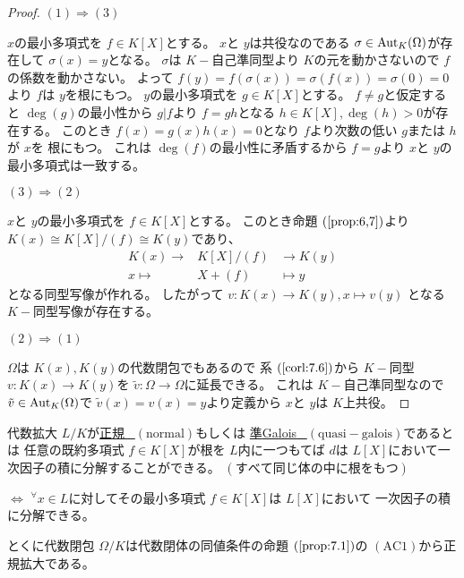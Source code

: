 \documentclass[../master_galois_theory]{subfiles}
\begin{document}
\begin{proof}
  $(1) \Rightarrow (3)$

  $x$の最小多項式を $f \in K[X]$とする。
  $x$と $y$は共役なのである $\sigma \in \mathrm{Aut}_K(\Omega)$が存在して
  $\sigma(x) = y$となる。
  $\sigma$は $K-$自己準同型より $K$の元を動かさないので $f$の係数を動かさない。
  よって $f(y) = f(\sigma(x)) = \sigma(f(x)) = \sigma(0) = 0$より
  $f$は $y$を根にもつ。
  $y$の最小多項式を $g \in K[X]$とする。
  $f \neq g$と仮定すると $\deg(g)$の最小性から $g|f$より
  $f = gh$となる $h \in K[X] , \deg(h) > 0$が存在する。
  このとき $f(x) = g(x)h(x) = 0$となり $f$より次数の低い $g$または $h$が $x$を
  根にもつ。
  これは $\deg(f)$の最小性に矛盾するから $f = g$より $x$と $y$の最小多項式は一致する。

  $(3) \Rightarrow (2)$

  $x$と $y$の最小多項式を $f \in K[X]$とする。
  このとき命題 $(\mathrm{\ref{prop:6,7}})$より
  $K(x) \cong K[X]/(f) \cong K(y)$であり、
  \begin{eqnarray*}
    K(x) \longrightarrow & K[X]/(f) & \longrightarrow K(y) \\
    x \longmapsto & X + (f) & \longmapsto y
  \end{eqnarray*}
  となる同型写像が作れる。
  したがって $v : K(x) \longrightarrow K(y) , x \longmapsto v(y)$
  となる $K-$同型写像が存在する。

  $(2) \Rightarrow (1)$

  $\Omega$は $K(x) , K(y)$の代数閉包でもあるので
  系 $(\mathrm{\ref{corl:7.6}})$から $K-$同型 $v : K(x) \longrightarrow K(y)$を
  $\tilde{v} : \Omega \longrightarrow \Omega$に延長できる。
  これは $K-$自己準同型なので $\tilde{v} \in \mathrm{Aut}_K(\Omega)$で
  $\tilde{v}(x) = v(x) = y$より定義から $x$と $y$は $K$上共役。
\end{proof}

\begin{defi}
  代数拡大 $L/K$が\underline{正規 \  $(\mathrm{normal})$}もしくは
  \underline{準\rm{Galois} \  $(\mathrm{quasi-galois})$}であるとは
  任意の既約多項式 $f \in K[X]$が根を $L$内に一つもてば
  $d$は $L[X]$において一次因子の積に分解することができる。
  $(すべて同じ体の中に根をもつ)$

  $\Leftrightarrow$
  ${}^\forall x \in L$に対してその最小多項式 $f \in K[X]$は $L[X]$において
  一次因子の積に分解できる。

  とくに代数閉包 $\Omega/K$は代数閉体の同値条件の命題 $(\mathrm{\ref{prop:7.1}})$の $(\mathrm{AC}1)$から正規拡大である。
\end{defi}
\end{document}
